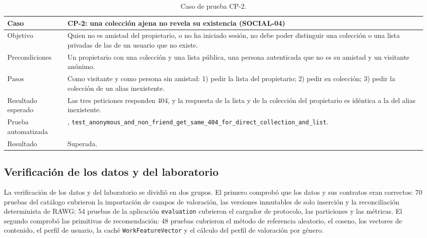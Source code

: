 \begin{table}[htp]
\centering
\small
\begin{tabularx}{\textwidth}{ | L{0.22\textwidth} | Y | }
    \hline
    \textbf{Caso} & \textbf{CP-2: una colección ajena no revela su existencia (SOCIAL-04)} \\
    \hline
    Objetivo & Quien no es amistad del propietario, o no ha iniciado sesión, no debe poder distinguir una colección o una lista privadas de las de un usuario que no existe. \\
    \hline
    Precondiciones & Un propietario con una colección y una lista pública, una persona autenticada que no es su amistad y un visitante anónimo. \\
    \hline
    Pasos & Como visitante y como persona sin amistad: 1) pedir la lista del propietario; 2) pedir su colección; 3) pedir la colección de un alias inexistente. \\
    \hline
    Resultado esperado & Las tres peticiones responden 404, y la respuesta de la lista y de la colección del propietario es idéntica a la del alias inexistente. \\
    \hline
    Prueba automatizada & , \texttt{test\_\allowbreak{}anonymous\_\allowbreak{}and\_\allowbreak{}non\_\allowbreak{}friend\_\allowbreak{}get\_\allowbreak{}same\_\allowbreak{}404\_\allowbreak{}for\_\allowbreak{}direct\_\allowbreak{}collection\_\allowbreak{}and\_\allowbreak{}list}. \\
    \hline
    Resultado & Superada. \\
    \hline
\end{tabularx}
\caption{Caso de prueba CP-2.}
\label{tab:pru-cp2}
\end{table}

\subsection{Verificación de los datos y del laboratorio}\label{sec:pru-fase2}

La verificación de los datos y del laboratorio se dividió en dos grupos. El primero comprobó que los datos y
sus contratos eran correctos: 70 pruebas del catálogo cubrieron la importación de campos de
valoración, las versiones inmutables de solo inserción y la reconciliación determinista de RAWG; 54 pruebas de
la aplicación \texttt{evaluation} cubrieron el cargador de protocolo, las particiones y las
métricas. El segundo comprobó las primitivas de recomendación: 48 pruebas cubrieron el
método de referencia aleatorio, el coseno, los vectores de contenido, el perfil de usuario, la caché
\texttt{WorkFeatureVector} y el cálculo del perfil de valoración por género.

